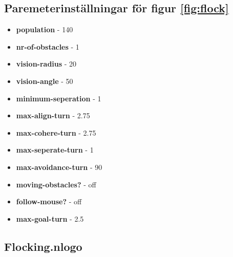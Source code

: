 \documentclass[titlepage, a4paper, 12pt]{article}
\begin{document}
\subsection{Paremeterinställningar för figur \ref{fig:flock}}\label{app:flock}
\begin{itemize}
\item \textbf{population} - 140
\item \textbf{nr-of-obstacles} - 1
\item \textbf{vision-radius} - 20
\item \textbf{vision-angle} - 50
\item \textbf{minimum-seperation} - 1
\item \textbf{max-align-turn} - 2.75
\item \textbf{max-cohere-turn} - 2.75
\item \textbf{max-seperate-turn} - 1
\item \textbf{max-avoidance-turn} - 90
\item \textbf{moving-obstacles?} - off
\item \textbf{follow-mouse?} - off
\item \textbf{max-goal-turn} - 2.5
\end{itemize}

\subsection{Flocking.nlogo}\label{app:Flocking.nlogo}
\begin{footnotesize}
  
\end{footnotesize}
\end{document}
